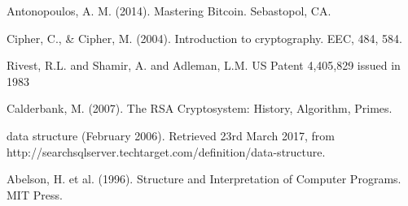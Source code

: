 \begin{thebibliography}{99}



{\sc Antonopoulos, A. M.} (2014).
Mastering Bitcoin.
{\em} Sebastopol, CA.

Cipher, C., \& Cipher, M. (2004). Introduction to cryptography. EEC, 484, 584.

Rivest, R.L. and Shamir, A. and Adleman, L.M. US Patent 4,405,829 issued in 1983

Calderbank, M. (2007). The RSA Cryptosystem: History, Algorithm, Primes.

{\sc data structure} (February 2006). Retrieved 23rd March 2017, from http://searchsqlserver.techtarget.com/definition/data-structure.

{\sc Abelson, H. et al.} (1996).
Structure and Interpretation of Computer Programs.
MIT Press.

\end{thebibliography}
